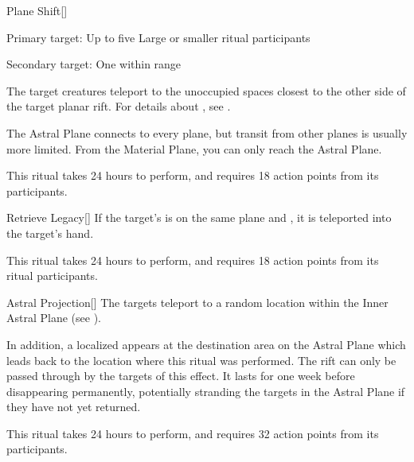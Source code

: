 \lowercase{\hypertarget{spell:Plane Shift}{}}\label{spell:Plane Shift}
\begin{apability}[Rank 4]{\hypertarget{spell:Plane Shift}{Plane Shift}}[]

Primary target: Up to five Large or smaller ritual participants
\par\noindent
Secondary target: One  within \rngmed range

The target creatures teleport to the unoccupied spaces closest to the other side of the target planar rift.
For details about , see .

The Astral Plane connects to every plane, but transit from other planes is usually more limited.
From the Material Plane, you can only reach the Astral Plane.

This ritual takes 24 hours to perform, and requires 18 action points from its participants.
\end{apability}
\vspace{0.25em}



\lowercase{\hypertarget{spell:Retrieve Legacy}{}}\label{spell:Retrieve Legacy}
\begin{apability}[Rank 4]{\hypertarget{spell:Retrieve Legacy}{Retrieve Legacy}}[]
If the target's  is on the same plane and , it is teleported into the target's hand.

This ritual takes 24 hours to perform, and requires 18 action points from its ritual participants.
\end{apability}
\vspace{0.25em}



\lowercase{\hypertarget{spell:Astral Projection}{}}\label{spell:Astral Projection}
\begin{apability}[Rank 5]{\hypertarget{spell:Astral Projection}{Astral Projection}}[]
The targets teleport to a random location within the Inner Astral Plane (see ).

In addition, a localized  appears at the destination area on the Astral Plane which leads back to the location where this ritual was performed.
The rift can only be passed through by the targets of this effect.
It lasts for one week before disappearing permanently, potentially stranding the targets in the Astral Plane if they have not yet returned.

This ritual takes 24 hours to perform, and requires 32 action points from its participants.
\end{apability}
\vspace{0.25em}



